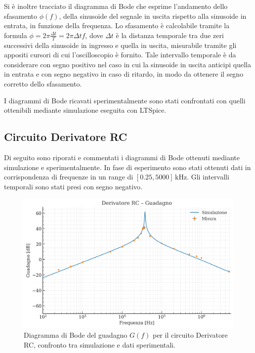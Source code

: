 \documentclass[a4paper,12pt]{article}
\begin{document}
Si è inoltre tracciato il diagramma di Bode che esprime l'andamento dello sfasamento $\phi(f)$, della sinusoide del segnale in uscita rispetto alla sinusoide in entrata, in funzione della frequenza. Lo sfasamento è calcolabile tramite la formula $\phi = 2\pi\frac{\Delta t}{T} = 2\pi\Delta tf $, dove $\Delta t$ è la distanza temporale tra due zeri successivi della sinusoide in ingresso e quella in uscita, misurabile tramite gli appositi cursori di cui l'oscilloscopio è fornito. Tale intervallo temporale è da considerare con segno positivo nel caso in cui la sinusoide in uscita anticipi quella in entrata e con segno negativo in caso di ritardo, in modo da ottenere il segno corretto dello sfasamento.

I diagrammi di Bode ricavati sperimentalmente sono stati confrontati con quelli ottenibili mediante simulazione eseguita con LTSpice.
\subsection{Circuito Derivatore RC}
Di seguito sono riporati e commentati i diagrammi di Bode ottenuti mediante simulazione e sperimentalmente. In fase di esperimento sono stati ottenuti dati in corrispondenza di frequenze in un range di $[0.25, 5000] \,\mathrm{kHz}$. Gli intervalli temporali sono stati presi con segno negativo.

\begin{figure}[H]
  \centering
  \includegraphics[width=.8\textwidth]{Derivatore_guadagno.png}
  \caption{Diagramma di Bode del guadagno $G(f)$ per il circuito Derivatore RC, confronto tra simulazione e dati sperimentali.}
\end{figure}
\end{document}
